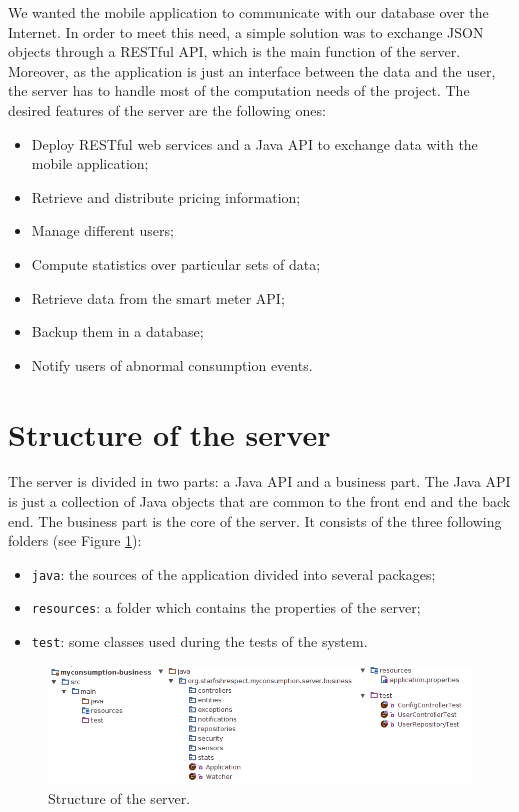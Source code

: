 \documentclass[a4paper, oneside, 11pt]{book}
\begin{document}
We wanted the mobile application to communicate with our database over the Internet. In order to meet this need, a simple solution was to exchange JSON objects through a RESTful API, which is the main function of the server. Moreover, as the application is just an interface between the data and the user, the server has to handle most of the computation needs of the project. The desired features of the server are the following ones:
\begin{itemize}
	\item Deploy RESTful web services and a Java API to exchange data with the mobile application;
	\item Retrieve and distribute pricing information;
	\item Manage different users;
	\item Compute statistics over particular sets of data;
	\item Retrieve data from the smart meter API;
	\item Backup them in a database;
	\item Notify users of abnormal consumption events.
\end{itemize}

\section{Structure of the server}
The server is divided in two parts: a Java API and a business part. The Java API is just a collection of Java objects that are common to the front end and the back end.
The business part is the core of the server. It consists of the three following folders (see Figure \ref{fig:back_end_struct}):
\begin{itemize}
	\item \texttt{java}: the sources of the application divided into several packages;
	\item \texttt{resources}: a folder which contains the properties of the server;
	\item \texttt{test}: some classes used during the tests of the system.
\end{itemize}

\begin{figure}[htbp]
	\centerline{\includegraphics[width=1\textwidth]{back_end_struct.png}}
	\caption{Structure of the server.}
	\label{fig:back_end_struct}
\end{figure}
\end{document}
